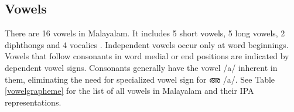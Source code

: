 \documentclass{ieeeaccess}
\begin{document}




\subsection{Vowels}

There are 16 vowels in Malayalam. It includes 5 short vowels, 5 long vowels, 2 diphthongs and 4 vocalics  \cite{asher1997}. Independent vowels occur only at word beginnings. Vowels that follow consonants in word medial or end positions are indicated by dependent vowel signs. Consonants generally have the vowel {\ipa /a/} inherent in them, eliminating the need for specialized vowel sign for {\mal അ} {\ipa /a/}. See Table \ref{vowelgrapheme} for the list of all vowels in Malayalam and their IPA representations.




\end{document}
